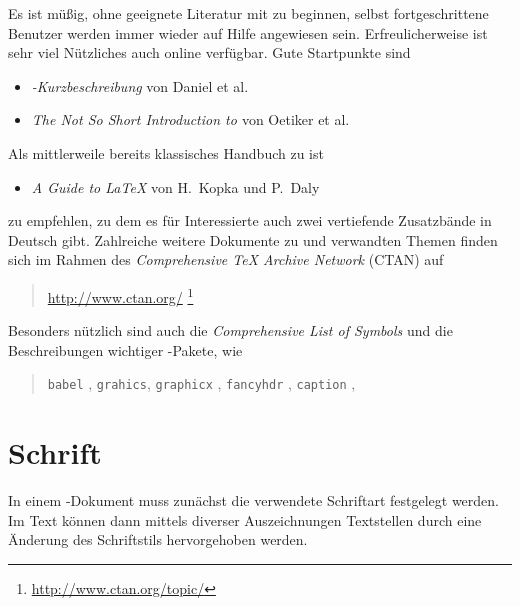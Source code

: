 Es ist müßig, ohne geeignete Literatur mit \latex zu beginnen, selbst
fortgeschrittene Benutzer werden immer wieder auf Hilfe angewiesen
sein. Erfreulicherweise ist sehr viel Nützliches auch online verfügbar.
Gute Startpunkte sind \zB
%
\begin{itemize}
\item \emph{\textrm{\LaTeXe}-Kurzbeschreibung} von Daniel et al.\ \cite{Daniel2016}
\item \emph{The Not So Short Introduction to \textrm{\LaTeXe}}
            von Oetiker et al.\ \cite{Oetiker2015}
\end{itemize}
%
\noindent
Als mittlerweile bereits klassisches Handbuch zu \latex ist
%
\begin{itemize}
  \item \emph{A Guide to \textrm{\LaTeX}} von H.~Kopka und P.~Daly \cite{Kopka2003}
\end{itemize}
%
zu empfehlen, zu dem es für Interessierte auch zwei vertiefende
Zusatzbände in Deutsch gibt. Zahlreiche weitere Dokumente zu
\latex und verwandten Themen finden sich \ua im Rahmen des {\em
Comprehensive TeX Archive Network} (CTAN) auf
\begin{quote}
	\url{http://www.ctan.org/}%
	\footnote{\url{http://www.ctan.org/topic/}}
\end{quote}
%
Besonders nützlich sind auch die
\emph{Comprehensive List of \textrm{\latex} Symbols} \cite{Pakin2017}
und die Beschreibungen wichtiger \latex-Pakete, wie
%
\begin{quote}
  \texttt{babel} \cite{Bezos2016},\newline
  \texttt{grahics}, \texttt{graphicx} \cite{Carlisle2016},\newline
  \texttt{fancyhdr} \cite{Oostrum2016},\newline
  \texttt{caption} \cite{Sommerfeldt2011},\newline
\end{quote}





\section{Schrift}

In einem \latex-Dokument muss zunächst die verwendete Schriftart festgelegt werden. Im Text können dann mittels diverser Auszeichnungen Textstellen durch eine Änderung des Schriftstils hervorgehoben werden.

